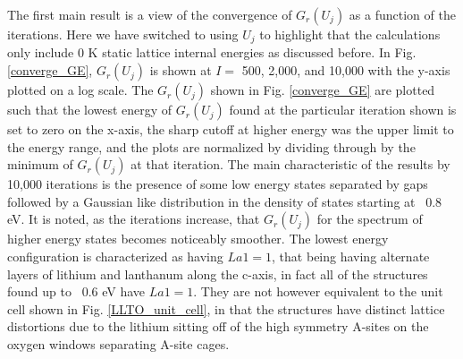 \documentclass[aps,pre,reprint,superscriptaddress,showkeys]{revtex4-2}
\begin{document}
The first main result is a view of the convergence of $G_r(U_j)$ as a function of the iterations. Here we have switched to using $U_j$ to highlight that the calculations only include 0 K static lattice internal energies as discussed before. In Fig. \ref{converge_GE},  $G_r(U_j)$ is shown at  $I= $ 500, 2,000, and 10,000 with the y-axis plotted on a log scale. The  $G_r(U_j)$ shown in Fig. \ref{converge_GE}  are plotted such that the lowest energy of $G_r(U_j)$ found at the particular iteration shown is set to zero on the x-axis, the sharp cutoff at higher energy was the upper limit to the energy range, and the plots are normalized by dividing through by the minimum of $G_r(U_j)$ at that iteration.  The main characteristic of the results by 10,000 iterations is the presence of some low energy states separated by gaps followed by a Gaussian like distribution in the density of states starting at ~0.8 eV. It is noted, as the iterations increase, that $G_r(U_j)$ for the spectrum of higher energy states becomes noticeably smoother.  The lowest energy configuration is  characterized as having  $La1=1$, that being having alternate layers of lithium and lanthanum along the c-axis, in fact all of the structures found up to ~0.6 eV have $La1=1$. They are not however equivalent to the unit cell shown in Fig. \ref{LLTO_unit_cell}, in that the structures have distinct lattice distortions due to the lithium sitting off of the high symmetry A-sites on the oxygen windows separating A-site cages. 
\end{document}
